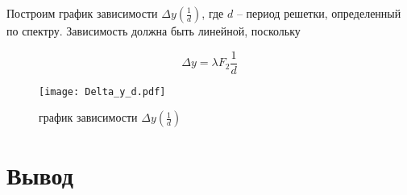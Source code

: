 	Построим график зависимости $\Delta y(\frac{1}{d})$, где $d$ -- период решетки, определенный по спектру. Зависимость должна быть линейной, поскольку
	
	\begin{equation}
		\Delta y = \lambda F_2 \frac{1}{d}
	\end{equation} 
	
	
	
	\begin{figure}
		\centering
		\texttt{[image: Delta\_y\_d.pdf]}
		\caption{график зависимости $\Delta y(\frac{1}{d})$}
	\end{figure}

	\section{Вывод}

    
